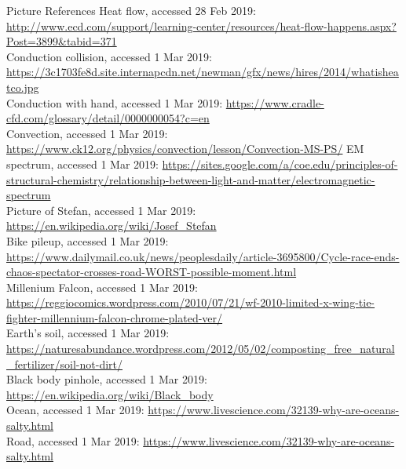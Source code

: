 \documentclass{beamer}
\begin{document}
\begin{frame}{Picture References}
Heat flow, accessed 28 Feb 2019: \href{http://www.ecd.com/support/learning-center/resources/heat-flow-happens.aspx?Post=3899\&tabid=371}{http://www.ecd.com/support/learning-center/resources/heat-flow-happens.aspx?Post=3899\&tabid=371}\\
Conduction collision, accessed 1 Mar 2019: \href{https://3c1703fe8d.site.internapcdn.net/newman/gfx/news/hires/2014/whatisheatco.jpg}{https://3c1703fe8d.site.internapcdn.net/newman/gfx/news/hires/2014/whatisheatco.jpg}\\
Conduction with hand, accessed 1 Mar 2019: \href{https://www.cradle-cfd.com/glossary/detail/0000000054?c=en}{https://www.cradle-cfd.com/glossary/detail/0000000054?c=en}\\
Convection, accessed 1 Mar 2019: \href{https://www.ck12.org/physics/convection/lesson/Convection-MS-PS/}{https://www.ck12.org/physics/convection/lesson/Convection-MS-PS/}
EM spectrum, accessed 1 Mar 2019: \href{https://sites.google.com/a/coe.edu/principles-of-structural-chemistry/relationship-between-light-and-matter/electromagnetic-spectrum}{https://sites.google.com/a/coe.edu/principles-of-structural-chemistry/relationship-between-light-and-matter/electromagnetic-spectrum}\\
Picture of Stefan, accessed 1 Mar 2019: \href{https://en.wikipedia.org/wiki/Josef_Stefan}{https://en.wikipedia.org/wiki/Josef\_Stefan}\\
Bike pileup, accessed 1 Mar 2019: \href{https://www.dailymail.co.uk/news/peoplesdaily/article-3695800/Cycle-race-ends-chaos-spectator-crosses-road-WORST-possible-moment.html}{https://www.dailymail.co.uk/news/peoplesdaily/article-3695800/Cycle-race-ends-chaos-spectator-crosses-road-WORST-possible-moment.html}\\
Millenium Falcon, accessed 1 Mar 2019: \href{https://reggiocomics.wordpress.com/2010/07/21/wf-2010-limited-x-wing-tie-fighter-millennium-falcon-chrome-plated-ver/}{https://reggiocomics.wordpress.com/2010/07/21/wf-2010-limited-x-wing-tie-fighter-millennium-falcon-chrome-plated-ver/}\\
Earth's soil, accessed 1 Mar 2019: \href{https://naturesabundance.wordpress.com/2012/05/02/composting_free_natural_fertilizer/soil-not-dirt/}{https://naturesabundance.wordpress.com/2012/05/02/composting\_free\_natural\_fertilizer/soil-not-dirt/}\\
Black body pinhole, accessed 1 Mar 2019: \href{https://en.wikipedia.org/wiki/Black_body}{https://en.wikipedia.org/wiki/Black\_body}\\
Ocean, accessed 1 Mar 2019: \href{https://www.livescience.com/32139-why-are-oceans-salty.html}{https://www.livescience.com/32139-why-are-oceans-salty.html}\\
Road, accessed 1 Mar 2019: \href{https://www.livescience.com/32139-why-are-oceans-salty.html}{https://www.livescience.com/32139-why-are-oceans-salty.html}\\
\end{frame}
\end{document}
